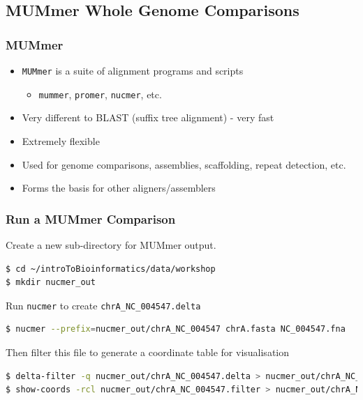 %

\subsection{MUMmer Whole Genome Comparisons}
\begin{frame}
  \frametitle{MUMmer}
  \begin{itemize}
    \item \texttt{MUMmer} is a suite of alignment programs and scripts
    \begin{itemize}
      \item \texttt{mummer}, \texttt{promer}, \texttt{nucmer}, etc.
    \end{itemize}
    \item Very different to BLAST (suffix tree alignment) - very fast
    \item Extremely flexible
    \item Used for genome comparisons, assemblies, scaffolding, repeat detection, etc.
    \item Forms the basis for other aligners/assemblers
  \end{itemize}
\end{frame}

\begin{frame}[fragile]
  \frametitle{Run a MUMmer Comparison}
  Create a new sub-directory for MUMmer output.
\begin{lstlisting}[language=bash]
$ cd ~/introToBioinformatics/data/workshop
$ mkdir nucmer_out
\end{lstlisting}
    Run \texttt{nucmer} to create \texttt{chrA\_NC\_004547.delta} \\
\begin{lstlisting}[language=bash]
$ nucmer --prefix=nucmer_out/chrA_NC_004547 chrA.fasta NC_004547.fna
\end{lstlisting}
    Then filter this file to generate a coordinate table for visualisation
\begin{lstlisting}[language=bash]
$ delta-filter -q nucmer_out/chrA_NC_004547.delta > nucmer_out/chrA_NC_004547.filter
$ show-coords -rcl nucmer_out/chrA_NC_004547.filter > nucmer_out/chrA_NC_004547_filtered.coords
\end{lstlisting}
\end{frame}

